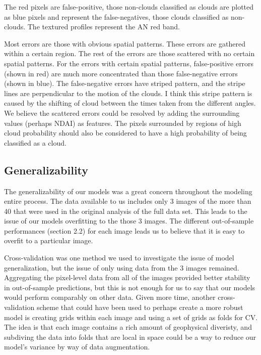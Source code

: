 \documentclass{article}\usepackage[]{graphicx}\usepackage[]{color}
\begin{document}
The red pixels are false-positive, those non-clouds classified as clouds are plotted as blue pixels and represent the false-negatives, those clouds classified as non-clouds.  The textured profiles represent the AN red band.

Most errors are those with obvious spatial patterns. These errors are gathered within a certain region.  
The rest of the errors are those scattered with no certain spatial patterns. 
For the errors with certain spatial patterns, false-positive errors (shown in red) are much more concentrated than those false-negative errors (shown in blue). The false-negative errors have striped pattern, and the stripe lines are perpendicular to the motion of the clouds. I think this stripe pattern is caused by the shifting of cloud between the times taken from the different angles.
We believe the scattered errors could be resolved by adding the surrounding values (perhaps NDAI) as features.  The pixels surrounded by regions of high cloud probability should also be considered to have a high probability of being classified as a cloud.

\subsection{Generalizability}

The generalizability of our models was a great concern throughout the modeling entire process. The data available to us includes only 3 images of the more than 40 that were used in the original analysis of the full data set. This leads to the issue of our models overfitting to the those 3 images. The different out-of-sample performances (section 2.2) for each image leads us to believe that it is easy to overfit to a particular image.

Cross-validation was one method we used to investigate the issue of model generalization, but the issue of only using data from the 3 images remained. Aggregating the pixel-level data from all of the images provided better stability in out-of-sample predictions, but this is not enough for us to say that our models would perform comparably on other data. Given more time, another cross-validation scheme that could have been used to perhaps create a more robust model is creating grids within each image and using a set of grids as folds for CV. The idea is that each image contains a rich amount of geophysical diveristy, and subdiving the data into folds that are local in space could be a way to reduce our model's variance by way of data augmentation.
\end{document}

